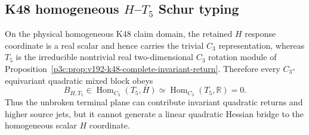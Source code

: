 \documentclass[12pt,a4paper]{article}
\begin{document}
\subsection{K48 homogeneous $H$--$T_5$ Schur typing}
\label{p3c:sec:v193-k48-h-t5-schur-typing}

\begin{corollary}
\label{p3c:cor:v193-k48-h-t5-mixed-zero}
On the physical homogeneous K48 claim domain, the retained $H$ response
coordinate is a real scalar and hence carries the trivial $C_3$ representation,
whereas $T_5$ is the irreducible nontrivial real two-dimensional $C_3$ rotation
module of Proposition~\ref{p3c:prop:v192-k48-complete-invariant-return}.
Therefore every $C_3$-equivariant quadratic mixed block obeys
\[
 \boxed{
 B_{H,T_5}\in\operatorname{Hom}_{C_3}(T_5,H)
 \simeq\operatorname{Hom}_{C_3}(T_5,\mathbb R)=0.}
\]
Thus the unbroken terminal plane can contribute invariant quadratic returns and
higher source jets, but it cannot generate a linear quadratic Hessian bridge to
the homogeneous scalar $H$ coordinate.
\end{corollary}
\end{document}
